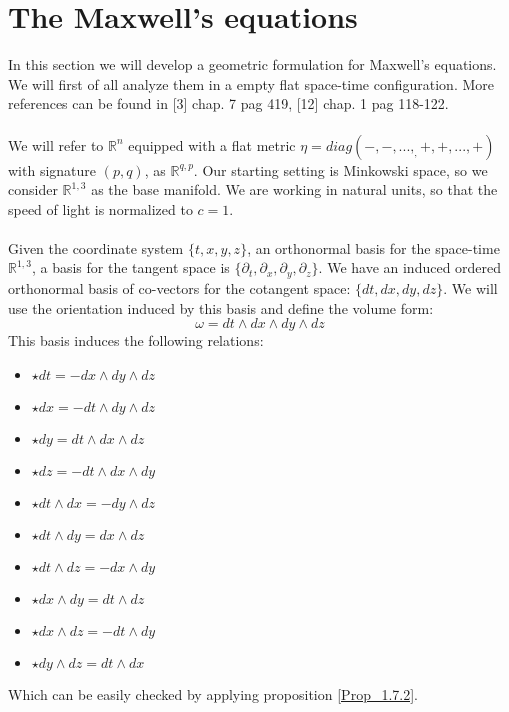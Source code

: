 \documentclass[12pt,a4paper]{report}
\theoremstyle{definition}
\theoremstyle{Theorem}
\theoremstyle{definition}
\theoremstyle{definition}
\begin{document}
	\section{The Maxwell's equations}
	In this section we will develop a geometric formulation for Maxwell's equations. We will first of all analyze them in a empty flat space-time configuration. More references can be found in [3] chap. 7 pag 419, [12] chap. 1 pag 118-122.\\
	\\
	We will refer to $\mathbb{R}^n$ equipped with a flat metric $\eta=diag(-,-,...,_,+,+,...,+)$ with signature $(p,q)$, as $\mathbb{R}^{q,p}$. Our starting setting is Minkowski space, so we consider $\mathbb{R}^{1,3}$ as the base manifold. We are working in natural units, so that the speed of light is normalized to $c=1$.\\
	\\
	Given the coordinate system $\{t,x,y,z\}$, an orthonormal basis for the space-time $\mathbb{R}^{1,3}$, a basis for the tangent space is $\{\partial_t,\partial_x,\partial_y,\partial_z\}$. We have an induced ordered orthonormal basis of co-vectors for the cotangent space: $\{dt,dx,dy,dz\}$. We will use the orientation induced by this basis and define the volume form:
	$$\omega=dt\wedge dx\wedge dy\wedge dz$$
	This basis induces the following relations:
	\begin{multicols}{2}
		\begin{itemize}
			\item $\star dt= -dx\wedge dy\wedge dz$
			\item $\star dx= -dt\wedge dy\wedge dz$
			\item $\star dy= dt\wedge dx\wedge dz$
			\item $\star dz=-dt\wedge dx\wedge dy$
			\item $\star dt\wedge dx=-dy\wedge dz$
		\end{itemize}
		\columnbreak
		\begin{itemize}
			\item $\star dt\wedge dy=dx\wedge dz$
			\item $\star dt\wedge dz=-dx\wedge dy$
			\item $\star dx\wedge dy=dt\wedge dz$
			\item $\star dx\wedge dz=-dt\wedge dy$
			\item $\star dy\wedge dz=dt\wedge dx$
		\end{itemize} 
	\end{multicols}
	Which can be easily checked by applying proposition \ref{Prop_1.7.2}.
\end{document}
